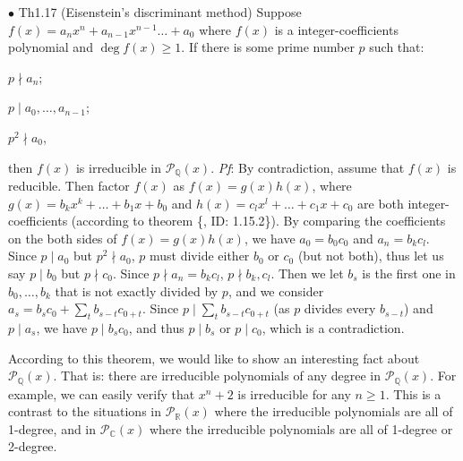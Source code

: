 \documentclass{article}
\begin{document}
\begin{Th}{$\bullet$ Th1.17 (Eisenstein's discriminant method)}
    Suppose $f(x) = a_nx^n + a_{n-1}x^{n-1}\dots + a_0$ where $f(x)$ is a integer-coefficients polynomial and $\deg f(x)\geq 1$. If there is some prime number $p$ such that:
    \begin{compactitem}
        \item $p\nmid a_n$;
        \item $p\mid a_0, \dots, a_{n-1}$;
        \item $p^2\nmid a_0$,
    \end{compactitem}
    then $f(x)$ is irreducible in $\mathcal{P}_\mathbb{Q}(x)$.
    \tcblower
    \textit{Pf}:
    By contradiction, assume that $f(x)$ is reducible. Then factor $f(x)$ as $f(x) = g(x)h(x)$, where $g(x) = b_kx^k + \dots + b_1x + b_0$ and $h(x) = c_lx^l + \dots + c_1x + c_0$ are both integer-coefficients (according to theorem \{, ID: 1.15.2\}). By comparing the coefficients on the both sides of $f(x) = g(x)h(x)$, we have $a_0 = b_0c_0$ and $a_n = b_kc_l$. Since $p\mid a_0$ but $p^2\nmid a_0$, $p$ must divide either $b_0$ or $c_0$ (but not both), thus let us say $p\mid b_0$ but $p\nmid c_0$. Since $p\nmid a_n = b_kc_l$, $p\nmid b_k, c_l$. Then we let $b_s$ is the first one in $b_0, \dots, b_k$ that is not exactly divided by $p$, and we consider $a_s = b_sc_0 + \sum_{t} b_{s-t}c_{0+t}$. Since $p\mid \sum_{t} b_{s-t}c_{0+t}$ (as $p$ divides every $b_{s-t}$) and $p\mid a_s$, we have $p\mid b_sc_0$, and thus $p\mid b_s$ or $p\mid c_0$, which is a contradiction. 
\end{Th}

\begin{Rmk}{}
    According to this theorem, we would like to show an interesting fact about $\mathcal{P}_\mathbb{Q}(x)$. That is: \textcolor{Th}{there are irreducible polynomials of any degree in $\mathcal{P}_\mathbb{Q}(x)$. For example, we can easily verify that $x^n+2$ is irreducible for any $n\geq 1$.} This is a contrast to the situations in $\mathcal{P}_\mathbb{R}(x)$ where the irreducible polynomials are all of 1-degree, and in $\mathcal{P}_\mathbb{C}(x)$ where the irreducible polynomials are all of 1-degree or 2-degree.
\end{Rmk}
\end{document}
